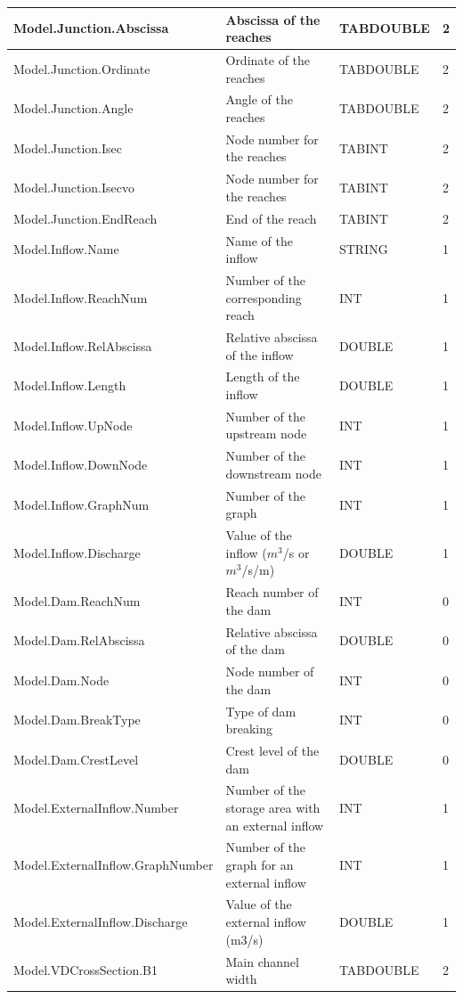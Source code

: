 \documentclass[a4paper,11pt]{article}
\begin{document}
\begin{landscape}
\begin{table}[ht]
\begin{center}
\begin{tabular}{|l|l|l|l|}
\hline  Model.Junction.Abscissa & Abscissa of the reaches & TABDOUBLE & 2 \\
\hline  Model.Junction.Ordinate & Ordinate of the reaches & TABDOUBLE & 2 \\
\hline  Model.Junction.Angle & Angle of the reaches & TABDOUBLE & 2 \\
\hline  Model.Junction.Isec & Node number for the reaches & TABINT & 2 \\
\hline  Model.Junction.Isecvo & Node number for the reaches & TABINT & 2 \\
\hline  Model.Junction.EndReach & End of the reach & TABINT & 2 \\
\hline  Model.Inflow.Name & Name of the inflow & STRING & 1 \\
\hline  Model.Inflow.ReachNum & Number of the corresponding reach & INT & 1 \\
\hline  Model.Inflow.RelAbscissa & Relative abscissa of the inflow & DOUBLE & 1 \\
\hline  Model.Inflow.Length & Length of the inflow & DOUBLE & 1 \\
\hline  Model.Inflow.UpNode & Number of the upstream node & INT & 1 \\
\hline  Model.Inflow.DownNode & Number of the downstream node & INT & 1 \\
\hline  Model.Inflow.GraphNum & Number of the graph & INT & 1 \\
\hline  Model.Inflow.Discharge & Value of the inflow ($m^3$/s or $m^3$/s/m) & DOUBLE & 1 \\
\hline  Model.Dam.ReachNum & Reach number of the dam & INT & 0 \\
\hline  Model.Dam.RelAbscissa & Relative abscissa of the dam & DOUBLE & 0 \\
\hline  Model.Dam.Node & Node number of the dam & INT & 0 \\
\hline  Model.Dam.BreakType & Type of dam breaking & INT & 0 \\
\hline  Model.Dam.CrestLevel & Crest level of the dam & DOUBLE & 0 \\
\hline  Model.ExternalInflow.Number & Number of the storage area with an external inflow & INT & 1 \\
\hline  Model.ExternalInflow.GraphNumber & Number of the graph for an external inflow & INT & 1 \\
\hline  Model.ExternalInflow.Discharge & Value of the external inflow (m3/s) & DOUBLE & 1 \\
\hline  Model.VDCrossSection.B1 & Main channel width & TABDOUBLE & 2 \\

\end{tabular}
\end{center}
\end{table}
\end{landscape}
\end{document}
